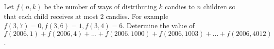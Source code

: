 Let $ f(n,k)$ be the number of ways of distributing $ k$ candies to $ n$ children so that each child receives at most $ 2$ candies. For example $ f(3,7) = 0,f(3,6) = 1,f(3,4) = 6$. Determine the value of $ f(2006,1) + f(2006,4) + \ldots + f(2006,1000) + f(2006,1003) + \ldots + f(2006,4012)$.